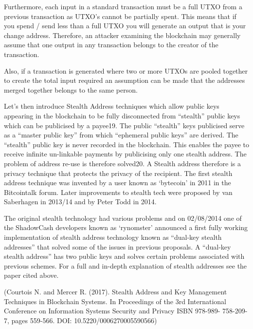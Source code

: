 Furthermore, each input in a standard transaction must be a full UTXO
from a previous transaction as UTXO’s cannot be partially spent. This
means that if you spend / send less than a full UTXO you will generate
an output that is your change address. Therefore, an attacker examining
the blockchain may generally assume that one output in any transaction
belongs to the creator of the transaction.



Also, if a transaction is generated where two or more UTXOs are pooled
together to create the total input required an assumption can be made
that the addresses merged together belongs to the same person.



Let’s then introduce Stealth Address techniques which allow public keys
appearing in the blockchain to be fully disconnected from “stealth” public
keys which can be publicised by a payee19. The public “stealth” keys
publicised serve as a “master public key” from which “ephemeral public
keys” are derived. The “stealth” public key is never recorded in the
blockchain. This enables the payee to receive infinite un-linkable
payments by publicising only one stealth address. The problem of address
re-use is therefore solved20. A Stealth address therefore is a privacy
technique that protects the privacy of the recipient. The first stealth
address technique was invented by a user known as ‘bytecoin’ in 2011 in
the Bitcointalk forum. Later improvements to stealth tech were proposed
by van Saberhagen in 2013/14 and by Peter Todd in 2014.



The original stealth technology had various problems and on 02/08/2014 one
of the ShadowCash developers known as ‘rynomster’ announced a first fully
working implementation of stealth address technology known as “dual-key
stealth addresses” that solved some of the issues in previous proposals.
A “dual-key stealth address” has two public keys and solves certain problems
associated with previous schemes. For a full and in-depth explanation of
stealth addresses see the paper cited above.



(Courtois N. and Mercer R. (2017). Stealth Address and Key Management
Techniques in Blockchain Systems. In Proceedings of the 3rd International
Conference on Information Systems Security and Privacy ISBN 978-989-
758-209-7, pages 559-566. DOI: 10.5220/0006270005590566)



